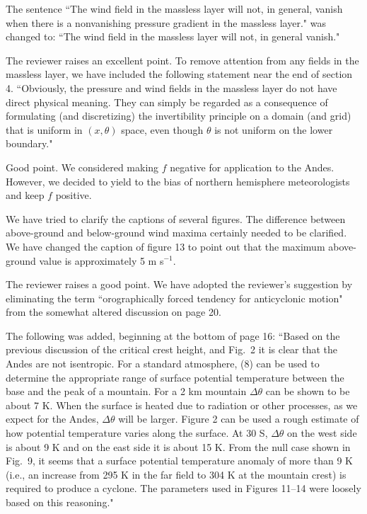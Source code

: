 \documentclass[11pt]{article}
\begin{document}
\medskip
{}  The sentence ``The wind field in the massless layer will not, 
in general, vanish when there is a nonvanishing pressure gradient in the massless 
layer." was changed to: ``The wind field in the massless layer will not, in general vanish." 

\medskip
{} The reviewer raises an excellent point. To remove attention 
from any fields in the massless layer, we have included the following statement 
near the end of section 4. ``Obviously, the pressure and wind fields in the massless layer do 
not have direct physical meaning. They can simply be regarded as 
a consequence of formulating (and discretizing) the invertibility 
principle on a domain (and grid) that is uniform in $(x,\theta)$ space, 
even though $\theta$ is not uniform on the lower boundary."   

\medskip
{} Good point. We considered making $f$ negative for application 
to the Andes. However, we decided to yield to the bias of northern hemisphere 
meteorologists and keep $f$ positive.  

\medskip
{}  We have tried to clarify the captions of several figures. 
The difference between above-ground and below-ground wind 
maxima certainly needed to be clarified. We have changed the caption of figure 
13 to point out that the maximum above-ground value is approximately 5 m s$^{-1}$. 

\medskip
{}  The reviewer raises a good point. We have adopted the reviewer's 
suggestion by eliminating the term ``orographically forced tendency for anticyclonic motion" 
from the somewhat altered discussion on page 20.

\medskip
{}  The following was added, beginning at the bottom of page 16: ``Based on the previous 
discussion of the critical crest height, and Fig.~2 it is clear that the 
Andes are not isentropic.  For a standard atmosphere, (8) can be used to
determine the appropriate range of surface potential temperature between 
the base and the peak of a mountain.  For a 2 km mountain $\Delta\theta$ can 
be shown to be about  7 K.  When the surface is heated due to radiation or 
other processes, as we expect for the Andes, $\Delta\theta$ will be larger.
Figure 2 can be used a rough estimate of how potential temperature varies 
along the surface.  At 30 S, $\Delta\theta$ on the west side is about 9 K and 
on the east side it is about 15 K.  From the null case shown in Fig.~9, it seems that a surface potential 
temperature anomaly of more than 9 K (i.e., an increase from 295 K in the far 
field to 304 K at the mountain crest) is required to produce a cyclone.  
The parameters used in Figures 11--14 were 
loosely based on this reasoning."       
\end{document}
